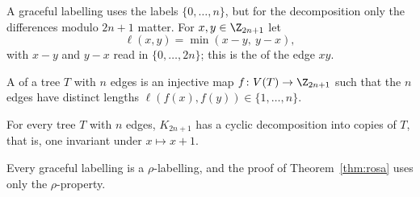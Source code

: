 
A graceful labelling uses the labels $\{0,\dots,n\}$, but for the decomposition only the differences modulo $2n+1$ matter. For $x,y\in\Z_{2n+1}$ let
\[
\ell(x,y)=\min(x-y,\ y-x),
\]
with $x-y$ and $y-x$ read in $\{0,\dots,2n\}$; this is the  of the edge $xy$.

\begin{definition}\label{def:rho}
A  of a tree $T$ with $n$ edges is an injective map $f\colon V(T)\to\Z_{2n+1}$ such that the $n$ edges have distinct lengths $\ell(f(x),f(y))\in\{1,\dots,n\}$.
\end{definition}

\begin{conjecture}\label{conj:kotzig}
For every tree $T$ with $n$ edges, $K_{2n+1}$ has a cyclic decomposition into copies of $T$, that is, one invariant under $x\mapsto x+1$.
\end{conjecture}

Every graceful labelling is a $\rho$-labelling, and the proof of Theorem~\ref{thm:rosa} uses only the $\rho$-property.
